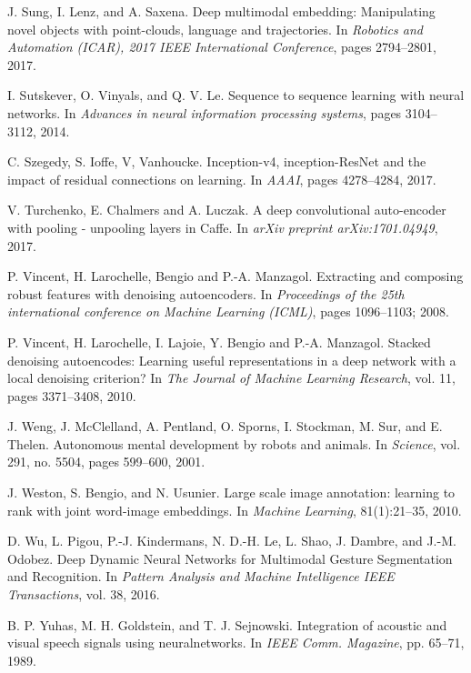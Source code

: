 \begin{thebibliography}{99}
{
  J. Sung, I. Lenz, and A. Saxena. Deep multimodal embedding:
  Manipulating novel objects with point-clouds, language and trajectories.
  In \textit{Robotics and Automation (ICAR), 2017 IEEE International
  Conference}, pages 2794--2801, 2017.

  I. Sutskever, O. Vinyals, and Q. V. Le. Sequence to sequence learning
  with neural networks. In \textit{Advances in neural information
  processing systems}, pages 3104--3112, 2014.

  C. Szegedy, S. Ioffe, V, Vanhoucke. Inception-v4, inception-ResNet and the
  impact of residual connections on learning. In \textit{AAAI},
  pages 4278--4284, 2017.

  V. Turchenko, E. Chalmers and A. Luczak. A deep convolutional auto-encoder
  with pooling - unpooling layers in Caffe. In \textit{arXiv preprint
  arXiv:1701.04949}, 2017.

  P. Vincent, H. Larochelle, Bengio and P.-A. Manzagol.
  Extracting and composing robust features with denoising autoencoders.
  In \textit{Proceedings of the 25th international conference
  on Machine Learning (ICML)}, pages 1096--1103; 2008.

  P. Vincent, H. Larochelle, I. Lajoie, Y. Bengio and P.-A. Manzagol.
  Stacked denoising autoencodes: Learning useful representations in a
  deep network with a local denoising criterion? In \textit{The Journal
  of Machine Learning Research}, vol. 11, pages 3371--3408, 2010.

J. Weng, J. McClelland, A. Pentland, O. Sporns, I. Stockman, M. Sur,
and E. Thelen. Autonomous mental development by robots and animals.
In \textit{Science}, vol. 291, no. 5504, pages 599–600, 2001.

  J. Weston, S. Bengio, and N. Usunier. 
  Large scale image annotation: learning to rank with joint word-image
  embeddings. In \textit{Machine Learning}, 81(1):21--35, 2010.

  D. Wu, L. Pigou, P.-J. Kindermans, N. D.-H. Le, L. Shao,
  J. Dambre, and J.-M. Odobez. 
  Deep Dynamic Neural Networks for Multimodal Gesture Segmentation and
  Recognition. In \textit{Pattern Analysis and Machine Intelligence
  IEEE Transactions}, vol. 38, 2016.

  B. P. Yuhas, M. H. Goldstein, and T. J. Sejnowski. Integration of acoustic
  and visual speech signals using neuralnetworks. In \textit{IEEE Comm.
  Magazine}, pp. 65--71, 1989.

}

\end{thebibliography}
